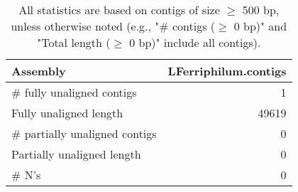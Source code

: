\documentclass[12pt,a4paper]{article}
\begin{document}
\begin{table}[ht]
\begin{center}
\caption{All statistics are based on contigs of size $\geq$ 500 bp, unless otherwise noted (e.g., "\# contigs ($\geq$ 0 bp)" and "Total length ($\geq$ 0 bp)" include all contigs).}
\begin{tabular}{|l*{1}{|r}|}
\hline
Assembly & LFerriphilum.contigs \\ \hline
\# fully unaligned contigs & 1 \\ \hline
Fully unaligned length & 49619 \\ \hline
\# partially unaligned contigs & 0 \\ \hline
Partially unaligned length & 0 \\ \hline
\# N's & 0 \\ \hline
\end{tabular}
\end{center}
\end{table}
\end{document}
